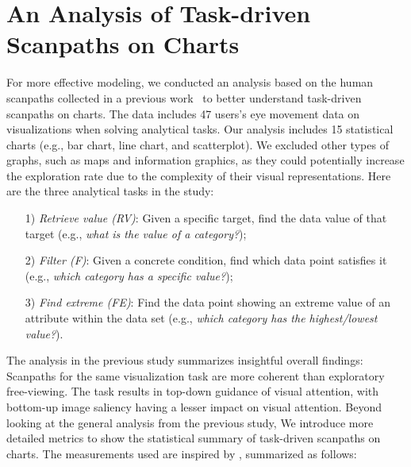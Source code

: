 \section{An Analysis of Task-driven Scanpaths on Charts}
\label{sec:analysis}


For more effective modeling, we conducted an analysis based on the human scanpaths collected in a previous work~\cite{polatsek2018exploring} to better understand task-driven scanpaths on charts. The data includes 47 users's eye movement data on visualizations when solving analytical tasks. Our analysis includes 15 statistical charts  (e.g., bar chart, line chart, and scatterplot). We excluded other types of graphs, such as maps and information graphics, as they could potentially increase the exploration rate due to the complexity of their visual representations. 
Here are the three analytical tasks in the study:

\begin{itemize}
    \item[1)] \textit{Retrieve value (RV)}: Given a specific target, find the data value of that target (e.g., \textit{what is the value of a category?});
    \item[2)] \textit{Filter (F)}: Given a concrete condition, find which data point satisfies it (e.g., \textit{which category has a specific value?});
    \item[3)] \textit{Find extreme (FE)}: Find the data point showing an extreme value of an attribute within the data set (e.g., \textit{which category has the highest/lowest value?}).
\end{itemize}


The analysis in the previous study summarizes insightful overall findings: Scanpaths for the same visualization task are more coherent than exploratory free-viewing. The task results in top-down guidance of visual attention, with bottom-up image saliency having a lesser impact on visual attention.
Beyond looking at the general analysis from the previous study, We introduce more detailed metrics to show the statistical summary of task-driven scanpaths on charts. The measurements used are inspired by \cite{goldberg2010comparing}, summarized as follows:

